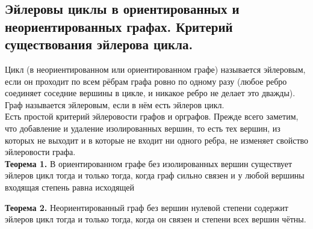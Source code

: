\subsection{Эйлеровы циклы в ориентированных и неориентированных графах. Критерий существования эйлерова цикла.}

Цикл (в неориентированном или ориентированном графе) называется эйлеровым, если он проходит по всем рёбрам графа ровно по одному разу (любое ребро соединяет соседние вершины в цикле, и никакое ребро не делает это дважды). \\ 

Граф называется эйлеровым, если в нём есть эйлеров цикл. \\

Есть простой критерий эйлеровости графов и орграфов. Прежде всего заметим, что добавление и удаление изолированных вершин, то есть тех вершин, из которых
не выходит и в которые не входит ни одного ребра, не изменяет свойство эйлеровости графа. \\

\textbf{Теорема 1.} В ориентированном графе без изолированных вершин существует эйлеров цикл тогда и только тогда, когда граф сильно связен и у любой вершины входящая степень равна исходящей

\textbf{Теорема 2.} Неориентированный граф без вершин нулевой степени содержит эйлеров цикл тогда и только тогда, когда он связен и степени всех вершин чётны.
